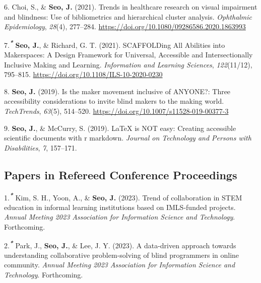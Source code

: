 \documentclass[11pt,a4paper,]{awesome-cv}
\begin{document}
\leavevmode{}%
6. Choi, S., \& \textbf{Seo, J.} (2021). Trends in healthcare research
on visual impairment and blindness: Use of bibliometrics and
hierarchical cluster analysis. \emph{Ophthalmic Epidemiology},
\emph{28}(4), 277--284.
\url{https://doi.org/10.1080/09286586.2020.1863993}

\leavevmode{}%
7.\textsuperscript{\textbf{\emph{*}}} \textbf{Seo, J.}, \& Richard, G.
T. (2021). SCAFFOLDing All Abilities into Makerspaces: A Design
Framework for Universal, Accessible and Intersectionally Inclusive
Making and Learning. \emph{Information and Learning Sciences},
\emph{122}(11/12), 795--815.
\url{https://doi.org/10.1108/ILS-10-2020-0230}

\leavevmode{}%
8. \textbf{Seo, J.} (2019). Is the maker movement inclusive of ANYONE?:
Three accessibility considerations to invite blind makers to the making
world. \emph{TechTrends}, \emph{63}(5), 514--520.
\url{https://doi.org/10.1007/s11528-019-00377-3}

\leavevmode{}%
9. \textbf{Seo, J.}, \& McCurry, S. (2019). LaTeX is NOT easy: Creating
accessible scientific documents with r markdown. \emph{Journal on
Technology and Persons with Disabilities}, \emph{7}, 157--171.

\hypertarget{papers-in-refereed-conference-proceedings}{%
\subsection{Papers in Refereed Conference
Proceedings}\label{papers-in-refereed-conference-proceedings}}

\hypertarget{bibliography}{}
\leavevmode{}%
1.\textsuperscript{\textbf{\emph{*}}} Kim, S. H., Yoon, A., \&
\textbf{Seo, J.} (2023). Trend of collaboration in STEM education in
informal learning institutions based on IMLS-funded projects.
\emph{Annual Meeting 2023 Association for Information Science and
Technology}. Forthcoming.

\leavevmode{}%
2.\textsuperscript{\textbf{\emph{*}}} Park, J., \textbf{Seo, J.}, \&
Lee, J. Y. (2023). A data-driven approach towards understanding
collaborative problem-solving of blind programmers in online community.
\emph{Annual Meeting 2023 Association for Information Science and
Technology}. Forthcoming.
\end{document}
